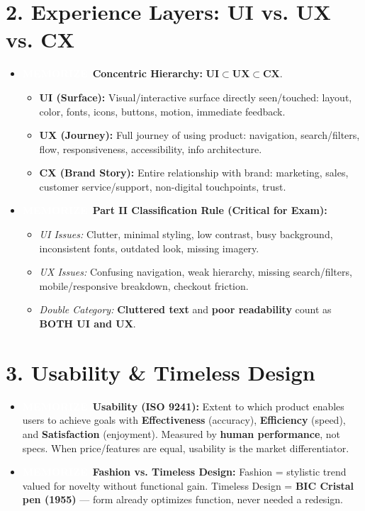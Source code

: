 \documentclass[8.5pt,a4paper,twocolumn]{article}
\newcommand{\tagmem}{\colorbox{accentred}{\textcolor{white}{\bfseries\fontsize{5.5pt}{6.5pt}\selectfont MEMORIZE}}\ }
\begin{document}
\section*{2. Experience Layers: UI vs. UX vs. CX}
\begin{itemize}[leftmargin=7pt, itemsep=1pt, topsep=0.5pt]
    \item \tagmem \textbf{Concentric Hierarchy:} $\mathbf{UI \subset UX \subset CX}$.
    \begin{itemize}[leftmargin=6pt, itemsep=0.5pt]
        \item \textbf{UI (Surface):} Visual/interactive surface directly seen/touched: layout, color, fonts, icons, buttons, motion, immediate feedback.
        \item \textbf{UX (Journey):} Full journey of using product: navigation, search/filters, flow, responsiveness, accessibility, info architecture.
        \item \textbf{CX (Brand Story):} Entire relationship with brand: marketing, sales, customer service/support, non-digital touchpoints, trust.
    \end{itemize}
    \item \tagmem \textbf{Part II Classification Rule (Critical for Exam):}
    \begin{itemize}[leftmargin=6pt, itemsep=0.5pt]
        \item \textit{UI Issues:} Clutter, minimal styling, low contrast, busy background, inconsistent fonts, outdated look, missing imagery.
        \item \textit{UX Issues:} Confusing navigation, weak hierarchy, missing search/filters, mobile/responsive breakdown, checkout friction.
        \item \textit{Double Category:} \textbf{Cluttered text} and \textbf{poor readability} count as \textbf{BOTH UI and UX}.
    \end{itemize}
\end{itemize}

\section*{3. Usability \& Timeless Design}
\begin{itemize}[leftmargin=7pt, itemsep=1pt, topsep=0.5pt]
    \item \tagmem \textbf{Usability (ISO 9241):} Extent to which product enables users to achieve goals with \textbf{Effectiveness} (accuracy), \textbf{Efficiency} (speed), and \textbf{Satisfaction} (enjoyment). Measured by \textbf{human performance}, not specs. When price/features are equal, usability is the market differentiator.
    \item \tagmem \textbf{Fashion vs. Timeless Design:} Fashion = stylistic trend valued for novelty without functional gain. Timeless Design = \textbf{BIC Cristal pen (1955)} --- form already optimizes function, never needed a redesign.
\end{itemize}
\end{document}
